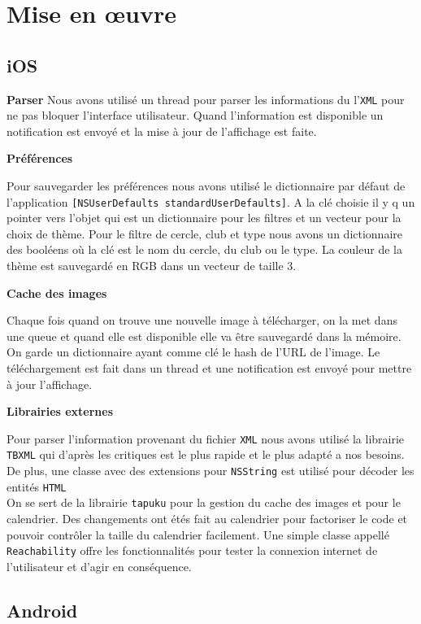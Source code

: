 \documentclass[a4paper, 11px]{article}
\begin{document}
\section{Mise en œuvre}

\subsection{iOS}
{\bf Parser}
Nous avons utilisé un thread pour parser les informations du l'\texttt{XML} pour ne pas bloquer l'interface utilisateur. Quand l'information est disponible un notification est envoyé et la mise à jour de l'affichage est faite.


{\bf Préférences}

Pour sauvegarder les préférences nous avons utilisé le dictionnaire par défaut de l'application 
\texttt{[NSUserDefaults standardUserDefaults]}. A la clé choisie il y q un pointer vers l'objet qui est un dictionnaire pour les filtres et un vecteur pour la choix de thème. Pour le filtre de cercle, club et type nous avons un dictionnaire des booléens où la clé est le nom du cercle, du club ou le type. La couleur de la thème est sauvegardé en RGB dans un vecteur de taille 3. 
 
{\bf Cache des images}

Chaque fois quand on trouve une nouvelle image à télécharger, on la met dans une queue et quand elle est disponible elle va être sauvegardé dans la mémoire. On garde un dictionnaire ayant comme clé le hash de l'URL de l'image. Le téléchargement est fait dans un thread et une notification est envoyé pour mettre à jour l'affichage.

{\bf Librairies externes}

Pour parser l'information provenant du fichier \texttt{XML} nous avons utilisé la librairie \texttt{TBXML} qui d'après les critiques est le plus rapide et le plus adapté a nos besoins. De plus, une classe avec des extensions pour \texttt{NSString} est utilisé pour décoder les entités \texttt{HTML}\\
\indent On se sert de la librairie \texttt{tapuku} pour la gestion du cache des images et pour le calendrier. Des changements ont étés fait au calendrier pour factoriser le code et pouvoir contrôler la taille du calendrier facilement.
Une simple classe appellé \texttt{Reachability} offre les fonctionnalités pour tester la connexion internet de l'utilisateur et d'agir en conséquence.


\subsection{Android}
\end{document}
